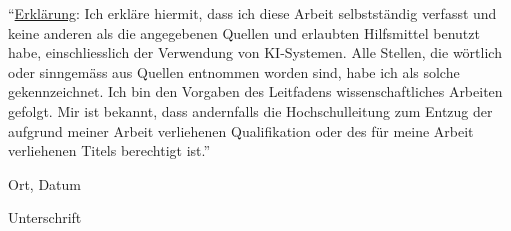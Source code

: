 
``\underline{Erklärung}: Ich erkläre hiermit, dass ich diese Arbeit selbstständig verfasst
und keine anderen als die angegebenen Quellen und erlaubten
Hilfsmittel benutzt habe, einschliesslich der Verwendung von KI-Systemen.
Alle Stellen, die wörtlich oder sinngemäss aus Quellen entnommen worden sind,
habe ich als solche gekennzeichnet. Ich bin den Vorgaben des Leitfadens
wissenschaftliches Arbeiten gefolgt. Mir ist bekannt, dass andernfalls die
Hochschulleitung zum Entzug der aufgrund meiner Arbeit verliehenen Qualifikation
oder des für meine Arbeit verliehenen Titels berechtigt ist.''

\hfill \break

\noindent\begin{minipage}[t]{.497\linewidth}\vspace{0pt}

\begin{centering}
Ort, Datum
\end{centering}

\end{minipage}
\noindent\begin{minipage}[t]{.497\linewidth}\vspace{0pt}

\begin{centering}
Unterschrift
\end{centering}

\end{minipage}

\thispagestyle{empty} %

